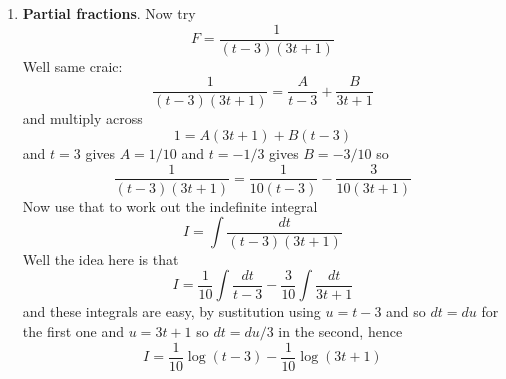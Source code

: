\documentclass[11pt,a4paper]{scrartcl}
\begin{document}
\begin{enumerate}
       \item \textbf{Partial fractions}. 
         Now try
         \begin{equation}
           F=\frac{1}{(t-3)(3t+1)}
         \end{equation}
         Well same craic:
         \begin{equation}
           \frac{1}{(t-3)(3t+1)}=\frac{A}{t-3}+\frac{B}{3t+1}
         \end{equation}
         and multiply across
         \begin{equation}
           1=A(3t+1)+B(t-3)
           \end{equation}
             and $t=3$ gives $A=1/10$ and $t=-1/3$ gives $B=-3/10$ so
             \begin{equation}
               \frac{1}{(t-3)(3t+1)}=\frac{1}{10(t-3)}-\frac{3}{10(3t+1)}
             \end{equation}             
      Now use that to work out the indefinite integral
         \begin{equation}
           I=\int \frac{dt}{(t-3)(3t+1)}
         \end{equation}
         Well the idea here is that
         \begin{equation}
           I=\frac{1}{10}\int\frac{dt}{t-3}-\frac{3}{10}\int\frac{dt}{3t+1}
         \end{equation}
         and these integrals are easy, by sustitution using $u=t-3$ and so $dt=du$ for the first one and $u=3t+1$ so $dt=du/3$ in the second, hence
         \begin{equation}
           I=\frac{1}{10}\log{(t-3)}-\frac{1}{10}\log{(3t+1)}
         \end{equation}
         

\end{enumerate}
\end{document}
